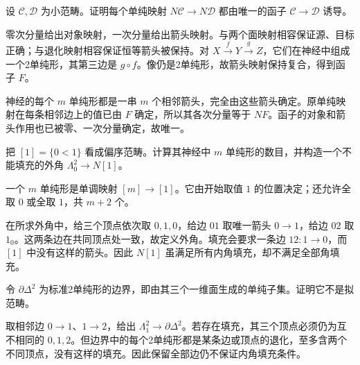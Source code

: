 \begin{exercise}\label{b4:ex:F-nerve-full-faithfulness}
	设 \(\mathcal C,\mathcal D\) 为小范畴。证明每个单纯映射 \(N\mathcal C\rightarrow N\mathcal D\) 都由唯一的函子 \(\mathcal C\rightarrow\mathcal D\) 诱导。
\end{exercise}
\begin{solution}
	零次分量给出对象映射，一次分量给出箭头映射。与两个面映射相容保证源、目标正确；与退化映射相容保证恒等箭头被保持。对 \(X\xrightarrow fY\xrightarrow gZ\)，它们在神经中组成一个2单纯形，其第三边是 \(g\circ f\)。像仍是2单纯形，故箭头映射保持复合，得到函子 \(F\)。

	神经的每个 \(m\) 单纯形都是一串 \(m\) 个相邻箭头，完全由这些箭头确定。原单纯映射在每条相邻边上的值已由 \(F\) 确定，所以其各次分量等于 \(N F\)。函子的对象和箭头作用也已被零、一次分量确定，故唯一。
\end{solution}

\begin{exercise}\label{b4:ex:F-interval-outer-horn}
	把 \([1]=\{0<1\}\) 看成偏序范畴。计算其神经中 \(m\) 单纯形的数目，并构造一个不能填充的外角 \(\Lambda_0^2\rightarrow N[1]\)。
\end{exercise}
\begin{solution}
	一个 \(m\) 单纯形是单调映射 \([m]\rightarrow[1]\)。它由开始取值 \(1\) 的位置决定；还允许全取 \(0\) 或全取 \(1\)，共 \(m+2\) 个。

	在所求外角中，给三个顶点依次取 \(0,1,0\)，给边 \(01\) 取唯一箭头 \(0\rightarrow1\)，给边 \(02\) 取 \(1_0\)。这两条边在共同顶点处一致，故定义外角。填充会要求一条边 \(12:1\rightarrow0\)，而 \([1]\) 中没有这样的箭头。因此 \(N[1]\) 虽满足所有内角填充，却不满足全部角填充。
\end{solution}

\begin{exercise}\label{b4:ex:F-boundary-not-quasicategory}
	令 \(\partial\Delta^2\) 为标准2单纯形的边界，即由其三个一维面生成的单纯子集。证明它不是拟范畴。
\end{exercise}
\begin{solution}
	取相邻边 \(0\rightarrow1\)、\(1\rightarrow2\)，给出 \(\Lambda_1^2\rightarrow\partial\Delta^2\)。若存在填充，其三个顶点必须仍为互不相同的 \(0,1,2\)。但边界中的每个2单纯形都是某条边或顶点的退化，至多含两个不同顶点，没有这样的填充。因此保留全部边仍不保证内角填充条件。
\end{solution}

